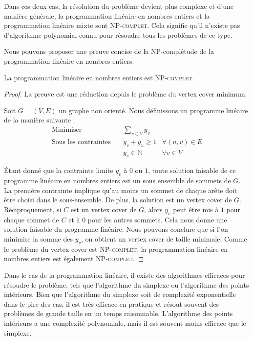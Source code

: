 \documentclass[a4paper]{article}
\begin{document}
Dans ces deux cas, la résolution du problème devient plus complexe et d'une manière générale, la programmation linéaire en nombres entiers et la programmation linéaire mixte sont \textsc{NP-complet}. Cela signifie qu'il n'existe pas d'algorithme polynomial connu pour résoudre tous les problèmes de ce type.

Nous pouvons proposer une preuve concise de la NP-complétude de la programmation linéaire en nombres entiers. 

\begin{theorem}
La programmation linéaire en nombres entiers est \textsc{NP-complet}.
\end{theorem}
\begin{proof}
	La preuve est une réduction depuis le problème du vertex cover minimum.

	Soit $G = (V, E)$ un graphe non orienté. Nous définissons un programme linéaire de la manière suivante :
	\begin{align*}
	\text{Minimiser} \quad & \sum_{v \in V} y_v \\
	\text{Sous les contraintes} \quad
	& y_v + y_u \geq 1 & \forall (u, v) \in E \\
	& y_v \in \mathbb{N} & \forall v \in V
	\end{align*}

	Étant donné que la contrainte limite $y_v$ à $0$ ou $1$, toute solution faisable de ce programme linéaire en nombres entiers est un sous ensemble de sommets de $G$. La première contrainte implique qu'au moins un sommet de chaque arête doit être choisi dans le sous-ensemble. De plus, la solution est un vertex cover de $G$. Réciproquement, si $C$ est un vertex cover de $G$, alors $y_v$ peut être mis à $1$ pour chaque sommet de $C$ et à $0$ pour les autres sommets. Cela nous donne une solution faisable du programme linéaire. Nous pouvons conclure que si l'on minimise la somme des $y_v$, on obtient un vertex cover de taille minimale. Comme le problème du vertex cover est \textsc{NP-complet}, la programmation linéaire en nombres entiers est également \textsc{NP-complet}.
\end{proof}

Dans le cas de la programmation linéaire, il existe des algorithmes efficaces pour résoudre le problème, tels que l'algorithme du simplexe ou l'algorithme des points intérieurs. Bien que l'algorithme du simplexe soit de complexité exponentielle dans le pire des cas, il est très efficace en pratique et résout souvent des problèmes de grande taille en un temps raisonnable. L'algorithme des points intérieurs a une complexité polynomiale, mais il est souvent moins efficace que le simplexe.
\end{document}

